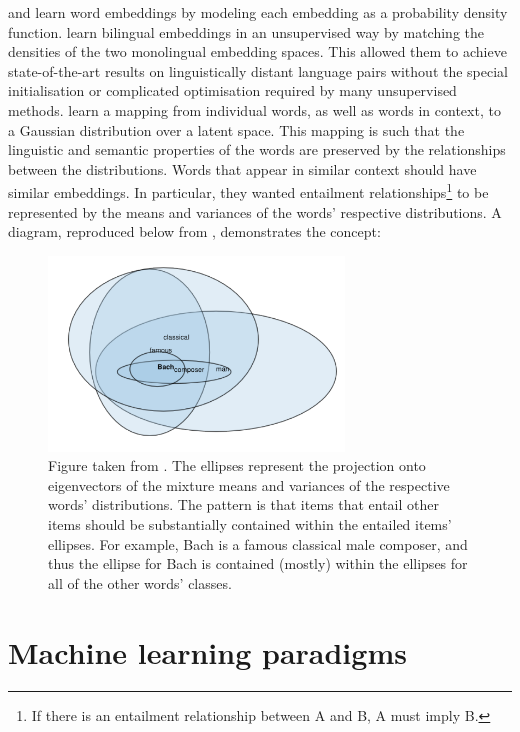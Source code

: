 \cite{DensityMatchingWordEmbeddings} and \cite{vilnis2015word} learn word embeddings by modeling each embedding as a probability density function. \cite{DensityMatchingWordEmbeddings} learn bilingual embeddings in an unsupervised way by matching the densities of the two monolingual embedding spaces. This allowed them to achieve state-of-the-art results on linguistically distant language pairs without the special initialisation or complicated optimisation required by many unsupervised methods. \cite{vilnis2015word} learn a mapping from individual words, as well as words in context, to a Gaussian distribution over a latent space. This mapping is such that the linguistic and semantic properties of the words are preserved by the relationships between the distributions. Words that appear in similar context should have similar embeddings. In particular, they wanted entailment relationships\footnote{If there is an entailment relationship between A and B, A must imply B.} to be represented by the means and variances of the words' respective distributions. A diagram, reproduced below from \cite{vilnis2015word}, demonstrates the concept: 

 \begin{figure}[H]
    \centering
    \includegraphics[width=0.7\textwidth]{images/review/entailment.png}
    \caption{
        Figure taken from \cite{vilnis2015word}. The ellipses represent the projection onto eigenvectors of the mixture means and variances of the respective words' distributions. The pattern is that items that entail other items should be substantially contained within the entailed items' ellipses. For example, Bach is a famous classical male composer, and thus the ellipse for Bach is contained (mostly) within the ellipses for all of the other words' classes. 
    }
\end{figure}

\newpage
\section{Machine learning paradigms}

